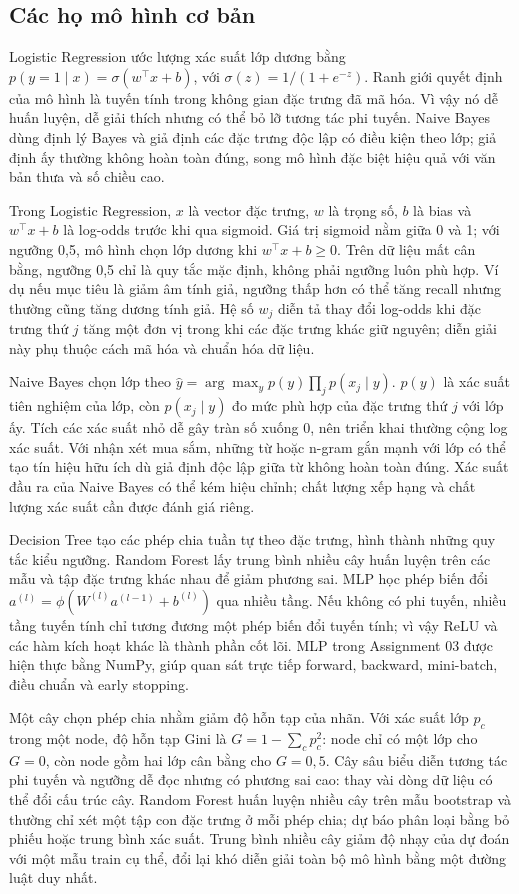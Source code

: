 \documentclass[12pt,a4paper]{report}
\begin{document}
\subsection{Các họ mô hình cơ bản}
Logistic Regression ước lượng xác suất lớp dương bằng $p(y=1\mid x)=\sigma(w^\top x+b)$, với $\sigma(z)=1/(1+e^{-z})$. Ranh giới quyết định của mô hình là tuyến tính trong không gian đặc trưng đã mã hóa. Vì vậy nó dễ huấn luyện, dễ giải thích nhưng có thể bỏ lỡ tương tác phi tuyến. Naive Bayes dùng định lý Bayes và giả định các đặc trưng độc lập có điều kiện theo lớp; giả định ấy thường không hoàn toàn đúng, song mô hình đặc biệt hiệu quả với văn bản thưa và số chiều cao.

Trong Logistic Regression, $x$ là vector đặc trưng, $w$ là trọng số, $b$ là bias và $w^\top x+b$ là log-odds trước khi qua sigmoid. Giá trị sigmoid nằm giữa 0 và 1; với ngưỡng 0,5, mô hình chọn lớp dương khi $w^\top x+b\geq0$. Trên dữ liệu mất cân bằng, ngưỡng 0,5 chỉ là quy tắc mặc định, không phải ngưỡng luôn phù hợp. Ví dụ nếu mục tiêu là giảm âm tính giả, ngưỡng thấp hơn có thể tăng recall nhưng thường cũng tăng dương tính giả. Hệ số $w_j$ diễn tả thay đổi log-odds khi đặc trưng thứ $j$ tăng một đơn vị trong khi các đặc trưng khác giữ nguyên; diễn giải này phụ thuộc cách mã hóa và chuẩn hóa dữ liệu.

Naive Bayes chọn lớp theo $\hat y=\arg\max_y p(y)\prod_jp(x_j\mid y)$. $p(y)$ là xác suất tiên nghiệm của lớp, còn $p(x_j\mid y)$ đo mức phù hợp của đặc trưng thứ $j$ với lớp ấy. Tích các xác suất nhỏ dễ gây tràn số xuống 0, nên triển khai thường cộng log xác suất. Với nhận xét mua sắm, những từ hoặc n-gram gắn mạnh với lớp có thể tạo tín hiệu hữu ích dù giả định độc lập giữa từ không hoàn toàn đúng. Xác suất đầu ra của Naive Bayes có thể kém hiệu chỉnh; chất lượng xếp hạng và chất lượng xác suất cần được đánh giá riêng.

Decision Tree tạo các phép chia tuần tự theo đặc trưng, hình thành những quy tắc kiểu ngưỡng. Random Forest lấy trung bình nhiều cây huấn luyện trên các mẫu và tập đặc trưng khác nhau để giảm phương sai. MLP học phép biến đổi $a^{(l)}=\phi(W^{(l)}a^{(l-1)}+b^{(l)})$ qua nhiều tầng. Nếu không có phi tuyến, nhiều tầng tuyến tính chỉ tương đương một phép biến đổi tuyến tính; vì vậy ReLU và các hàm kích hoạt khác là thành phần cốt lõi. MLP trong Assignment 03 được hiện thực bằng NumPy, giúp quan sát trực tiếp forward, backward, mini-batch, điều chuẩn và early stopping.

Một cây chọn phép chia nhằm giảm độ hỗn tạp của nhãn. Với xác suất lớp $p_c$ trong một node, độ hỗn tạp Gini là $G=1-\sum_cp_c^2$: node chỉ có một lớp cho $G=0$, còn node gồm hai lớp cân bằng cho $G=0{,}5$. Cây sâu biểu diễn tương tác phi tuyến và ngưỡng dễ đọc nhưng có phương sai cao: thay vài dòng dữ liệu có thể đổi cấu trúc cây. Random Forest huấn luyện nhiều cây trên mẫu bootstrap và thường chỉ xét một tập con đặc trưng ở mỗi phép chia; dự báo phân loại bằng bỏ phiếu hoặc trung bình xác suất. Trung bình nhiều cây giảm độ nhạy của dự đoán với một mẫu train cụ thể, đổi lại khó diễn giải toàn bộ mô hình bằng một đường luật duy nhất.
\end{document}
